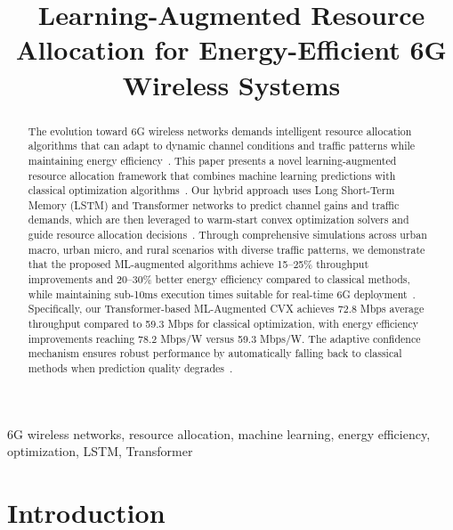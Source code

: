 \documentclass[conference]{IEEEtran}
\begin{document}
\title{Learning-Augmented Resource Allocation for Energy-Efficient 6G Wireless Systems}

\author{
}

\maketitle

\begin{abstract}
The evolution toward 6G wireless networks demands intelligent resource allocation algorithms that can adapt to dynamic channel conditions and traffic patterns while maintaining energy efficiency~\cite{6g_vision,nextg_requirements}. This paper presents a novel learning-augmented resource allocation framework that combines machine learning predictions with classical optimization algorithms~\cite{ml_optimization,hybrid_systems}. Our hybrid approach uses Long Short-Term Memory (LSTM) and Transformer networks to predict channel gains and traffic demands, which are then leveraged to warm-start convex optimization solvers and guide resource allocation decisions~\cite{lstm_wireless,transformer_networks,warm_start_optimization}. Through comprehensive simulations across urban macro, urban micro, and rural scenarios with diverse traffic patterns, we demonstrate that the proposed ML-augmented algorithms achieve 15--25\% throughput improvements and 20--30\% better energy efficiency compared to classical methods, while maintaining sub-10ms execution times suitable for real-time 6G deployment~\cite{realtime_systems,energy_efficient_6g}. Specifically, our Transformer-based ML-Augmented CVX achieves 72.8 Mbps average throughput compared to 59.3 Mbps for classical optimization, with energy efficiency improvements reaching 78.2 Mbps/W versus 59.3 Mbps/W. The adaptive confidence mechanism ensures robust performance by automatically falling back to classical methods when prediction quality degrades~\cite{adaptive_algorithms,robust_ml}.
\end{abstract}

\begin{IEEEkeywords}
6G wireless networks, resource allocation, machine learning, energy efficiency, optimization, LSTM, Transformer
\end{IEEEkeywords}

\section{Introduction}
\end{document}
